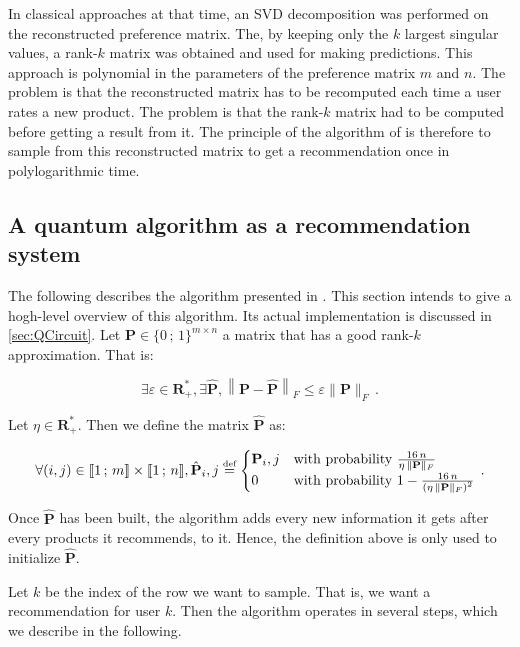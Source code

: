 \documentclass[11pt, a4paper]{article}
\begin{document}
            In classical approaches at that time, an SVD decomposition was performed on the reconstructed preference matrix. The, by keeping only the \(k\) largest singular values, a rank-\(k\) matrix was obtained and used for making predictions. This approach is polynomial in the parameters of the preference matrix \(m\) and \(n\). The problem is that the reconstructed matrix has to be recomputed each time a user rates a new product. The problem is that the rank-\(k\) matrix had to be computed before getting a result from it. The principle of the algorithm of \citeauthor{QRS} is therefore to sample from this reconstructed matrix to get a recommendation once in polylogarithmic time.
        \subsection{A quantum algorithm as a recommendation system}
            The following describes the algorithm presented in \cite{QRS}. This section intends to give a hogh-level overview of this algorithm. Its actual implementation is discussed in \autoref{sec:QCircuit}. Let \(\mathbf{P}\in\{0\,;\,1\}^{m\times n}\) a matrix that has a good rank-\(k\) approximation. That is:
            
            \[\exists\varepsilon\in\mathbf{R}_+^*,\exists\hat{\mathbf{P}},\left\|\mathbf{P} - \hat{\mathbf{P}}\right\|_F\leqslant\varepsilon\|\mathbf{P}\|_F\,.\]
            
            Let \(\eta\in\mathbf{R}_+^*\). Then we define the matrix \(\hat{\mathbf{P}}\) as:
            
            \[\forall(i, j)\in\llbracket1\,;\,m\rrbracket\times\llbracket1\,;\,n\rrbracket,\hat{\mathbf{P}}_i,j\overset{\text{\tiny{def}}}{=}\begin{cases}\mathbf{P}_i,j&\text{with probability } \frac{16\,n}{\eta\,\|\mathbf{P}\|_F}\\0&\text{with probability } 1-\frac{16\,n}{\left(\eta\,\|\mathbf{P}\|_F\right)^2}\end{cases}\,.\]
            
            Once \(\hat{\mathbf{P}}\) has been built, the algorithm adds every new information it gets after every products it recommends, to it. Hence, the definition above is only used to initialize \(\hat{\mathbf{P}}\).
            
            Let \(k\) be the index of the row we want to sample. That is, we want a recommendation for user \(k\). Then the algorithm operates in several steps, which we describe in the following.
            
\end{document}
